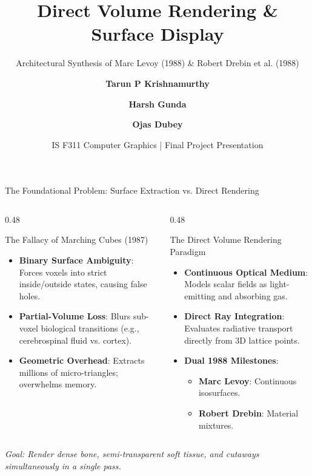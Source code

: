 \documentclass[aspectratio=169,11pt]{beamer}
\title{\textbf{Direct Volume Rendering \& Surface Display}}
\subtitle{Architectural Synthesis of Marc Levoy (1988) \& Robert Drebin et al. (1988)}
\author{\textbf{Tarun P Krishnamurthy} \and \textbf{Harsh Gunda} \and \textbf{Ojas Dubey}}
\institute{Department of Computer Science \& Information Systems\\Birla Institute of Technology and Science, Pilani}
\date{IS F311 Computer Graphics | Final Project Presentation}
\begin{document}
\begin{frame}
  \titlepage
\end{frame}

\begin{frame}{The Foundational Problem: Surface Extraction vs. Direct Rendering}
  \begin{columns}[T]
    \begin{column}{0.48\textwidth}
      \begin{block}{The Fallacy of Marching Cubes (1987)}
        \begin{itemize}
          \item \textbf{Binary Surface Ambiguity}: Forces voxels into strict inside/outside states, causing false holes.
          \item \textbf{Partial-Volume Loss}: Blurs sub-voxel biological transitions (e.g., cerebrospinal fluid vs. cortex).
          \item \textbf{Geometric Overhead}: Extracts millions of micro-triangles; overwhelms memory.
        \end{itemize}
      \end{block}
    \end{column}

    \begin{column}{0.48\textwidth}
      \begin{block}{The Direct Volume Rendering Paradigm}
        \begin{itemize}
          \item \textbf{Continuous Optical Medium}: Models scalar fields as light-emitting and absorbing gas.
          \item \textbf{Direct Ray Integration}: Evaluates radiative transport directly from 3D lattice points.
          \item \textbf{Dual 1988 Milestones}:
            \begin{itemize}
              \item \textbf{Marc Levoy}: Continuous isosurfaces.
              \item \textbf{Robert Drebin}: Material mixtures.
            \end{itemize}
        \end{itemize}
      \end{block}
    \end{column}
  \end{columns}

  \vspace{0.4cm}
  \centering
  \small
  \textit{Goal: Render dense bone, semi-transparent soft tissue, and cutaways simultaneously in a single pass.}
\end{frame}
\end{document}
